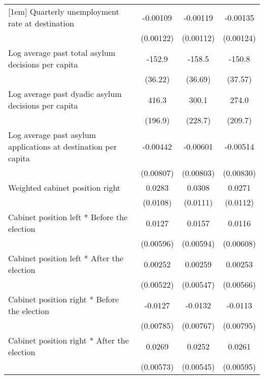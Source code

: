 \begin{table}[htbp]
\begin{tabular}{l*{3}{c}}
[1em]
Quarterly unemployment rate at destination&    -0.00109         &    -0.00119         &    -0.00135         \\
                    &   (0.00122)         &   (0.00112)         &   (0.00124)         \\
[1em]
Log average past total asylum decisions per capita&      -152.9\sym{***}&      -158.5\sym{***}&      -150.8\sym{***}\\
                    &     (36.22)         &     (36.69)         &     (37.57)         \\
[1em]
Log average past dyadic asylum decisions per capita&       416.3\sym{*}  &       300.1         &       274.0         \\
                    &     (196.9)         &     (228.7)         &     (209.7)         \\
[1em]
Log average past asylum applications at destination per capita&    -0.00442         &    -0.00601         &    -0.00514         \\
                    &   (0.00807)         &   (0.00803)         &   (0.00830)         \\
[1em]
Weighted cabinet position right&      0.0283\sym{*}  &      0.0308\sym{**} &      0.0271\sym{*}  \\
                    &    (0.0108)         &    (0.0111)         &    (0.0112)         \\
[1em]
Cabinet position left * Before the election&      0.0127\sym{*}  &      0.0157\sym{*}  &      0.0116         \\
                    &   (0.00596)         &   (0.00594)         &   (0.00608)         \\
[1em]
Cabinet position left * After the election&     0.00252         &     0.00259         &     0.00253         \\
                    &   (0.00522)         &   (0.00547)         &   (0.00566)         \\
[1em]
Cabinet position right * Before the election&     -0.0127         &     -0.0132         &     -0.0113         \\
                    &   (0.00785)         &   (0.00767)         &   (0.00795)         \\
[1em]
Cabinet position right * After the election&      0.0269\sym{***}&      0.0252\sym{***}&      0.0261\sym{***}\\
                    &   (0.00573)         &   (0.00545)         &   (0.00595)         \\

\end{tabular}
\end{table}
